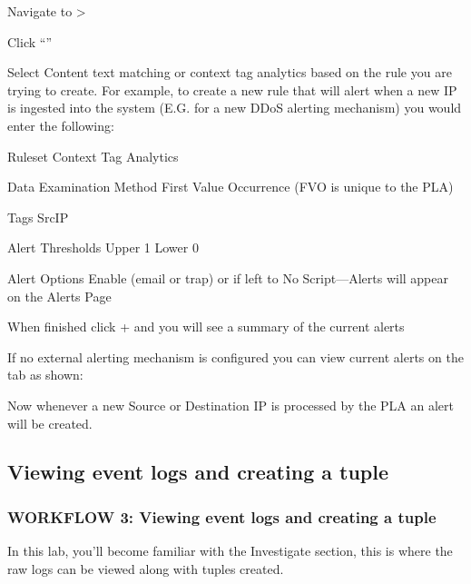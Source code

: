 \documentclass[letterpaper,10pt,english]{sphinxmanual}
\begin{document}
Navigate to  \textgreater{} 

Click “”

Select Content text matching or context tag analytics based on the rule
you are trying to create. For example, to create a new rule that will
alert when a new IP is ingested into the system (E.G. for a new DDoS
alerting mechanism) you would enter the following:

Ruleset \textendash{} Context Tag Analytics

Data Examination Method \textendash{} First Value Occurrence (FVO is unique to the
PLA)

Tags \textendash{} SrcIP

Alert Thresholds \textendash{} Upper 1 Lower 0

Alert Options \textendash{} Enable (email or trap) or if left to \textendash{}No Script—Alerts
will appear on the Alerts Page


When finished click + and you will see a summary of the current
alerts


If no external alerting mechanism is configured you can view current
alerts on the  tab as shown:


Now whenever a new Source or Destination IP is processed by the PLA an
alert will be created.


\subsection{Viewing event logs and creating a tuple}
\label{\detokenize{class1/module6/lab4:viewing-event-logs-and-creating-a-tuple}}\label{\detokenize{class1/module6/lab4::doc}}

\subsubsection{WORKFLOW 3: Viewing event logs and creating a tuple}
\label{\detokenize{class1/module6/lab4:workflow-3-viewing-event-logs-and-creating-a-tuple}}
In this lab, you’ll become familiar with the Investigate section, this
is where the raw logs can be viewed along with tuples created.
\end{document}
